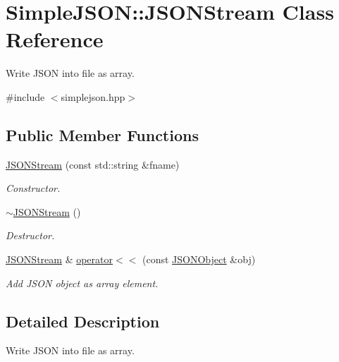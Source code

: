 \hypertarget{class_simple_j_s_o_n_1_1_j_s_o_n_stream}{\section{Simple\+J\+S\+O\+N\+:\+:J\+S\+O\+N\+Stream Class Reference}
\label{class_simple_j_s_o_n_1_1_j_s_o_n_stream}
}


Write J\+S\+O\+N into file as array.  




{\ttfamily \#include $<$simplejson.\+hpp$>$}

\subsection*{Public Member Functions}
\begin{DoxyCompactItemize}
\item 
\hyperlink{class_simple_j_s_o_n_1_1_j_s_o_n_stream_ad2d7a803a64014a10bf4b9c49e152b91}{J\+S\+O\+N\+Stream} (const std\+::string \&fname)
\begin{DoxyCompactList}\small\item\em Constructor. \end{DoxyCompactList}\item 
\hypertarget{class_simple_j_s_o_n_1_1_j_s_o_n_stream_a0982545bcc977b9232aa89c76b53cfa6}{\hyperlink{class_simple_j_s_o_n_1_1_j_s_o_n_stream_a0982545bcc977b9232aa89c76b53cfa6}{$\sim$\+J\+S\+O\+N\+Stream} ()}\label{class_simple_j_s_o_n_1_1_j_s_o_n_stream_a0982545bcc977b9232aa89c76b53cfa6}

\begin{DoxyCompactList}\small\item\em Destructor. \end{DoxyCompactList}\item 
\hyperlink{class_simple_j_s_o_n_1_1_j_s_o_n_stream}{J\+S\+O\+N\+Stream} \& \hyperlink{class_simple_j_s_o_n_1_1_j_s_o_n_stream_a2723b68fea24c6870bfdb6bb2d75006d}{operator$<$$<$} (const \hyperlink{namespace_simple_j_s_o_n_af08971ebbb6e72577450a7b8bde7f143}{J\+S\+O\+N\+Object} \&obj)
\begin{DoxyCompactList}\small\item\em Add J\+S\+O\+N object as array element. \end{DoxyCompactList}\end{DoxyCompactItemize}


\subsection{Detailed Description}
Write J\+S\+O\+N into file as array. 

